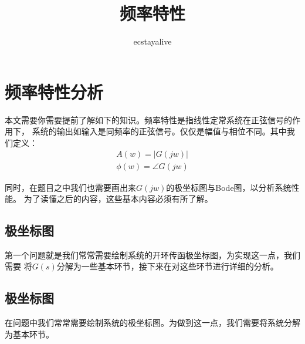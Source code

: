 \documentclass{ctexart}
\begin{document}
\title{频率特性}
\author{ecstayalive}
\maketitle

\section*{频率特性分析}
本文需要你需要提前了解如下的知识。频率特性是指线性定常系统在正弦信号的作用下，
系统的输出如输入是同频率的正弦信号。仅仅是幅值与相位不同。其中我们定义：
\begin{gather}
    A(w) = |G(jw)| \\
    \phi(w) = \angle G(jw)
\end{gather}

同时，在题目之中我们也需要画出来$G(jw)$的极坐标图与Bode图，以分析系统性能。
为了读懂之后的内容，这些基本内容必须有所了解。

\subsection*{极坐标图}
第一个问题就是我们常常需要绘制系统的开环传函极坐标图，为实现这一点，我们需要
将$G(s)$分解为一些基本环节，接下来在对这些环节进行详细的分析。

\subsection*{极坐标图}
在问题中我们常常需要绘制系统的极坐标图。为做到这一点，我们需要将系统分解为基本环节。
\end{document}
